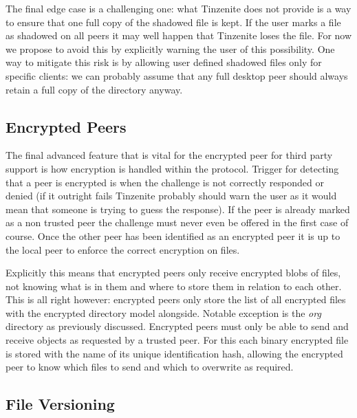 The final edge case is a challenging one: what Tinzenite does not provide is a way to ensure that one full copy of the shadowed file is kept.
If the user marks a file as shadowed on all peers it may well happen that Tinzenite loses the file.
For now we propose to avoid this by explicitly warning the user of this possibility.
One way to mitigate this risk is by allowing user defined shadowed files only for specific clients: we can probably assume that any full desktop peer should always retain a full copy of the directory anyway.


\subsection{Encrypted Peers}
\label{sub:Encrypted Peers}

The final advanced feature that is vital for the encrypted peer for third party support is how encryption is handled within the protocol.
Trigger for detecting that a peer is encrypted is when the challenge is not correctly responded or denied (if it outright fails Tinzenite probably should warn the user as it would mean that someone is trying to guess the response).
If the peer is already marked as a non trusted peer the challenge must never even be offered in the first case of course.
Once the other peer has been identified as an encrypted peer it is up to the local peer to enforce the correct encryption on files.

Explicitly this means that encrypted peers only receive encrypted blobs of files, not knowing what is in them and where to store them in relation to each other.
This is all right however: encrypted peers only store the list of all encrypted files with the encrypted directory model alongside.
Notable exception is the \textit{org} directory as previously discussed.
Encrypted peers must only be able to send and receive objects as requested by a trusted peer.
For this each binary encrypted file is stored with the name of its unique identification hash, allowing the encrypted peer to know which files to send and which to overwrite as required.

\subsection{File Versioning}
\label{sub:File Versioning}

